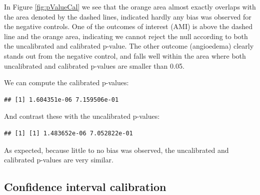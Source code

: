 \documentclass[11pt]{book}
\newenvironment{Shaded}{\begin{snugshade}}{\end{snugshade}}
\newcommand{\DataTypeTok}[1]{\textcolor[rgb]{0.13,0.29,0.53}{#1}}
\newcommand{\KeywordTok}[1]{\textcolor[rgb]{0.13,0.29,0.53}{\textbf{#1}}}
\newcommand{\NormalTok}[1]{#1}
\newcommand{\OperatorTok}[1]{\textcolor[rgb]{0.81,0.36,0.00}{\textbf{#1}}}
\newcommand{\StringTok}[1]{\textcolor[rgb]{0.31,0.60,0.02}{#1}}
\theoremstyle{definition}
\theoremstyle{definition}
\theoremstyle{definition}
\theoremstyle{remark}
\begin{document}
In Figure \ref{fig:pValueCal} we see that the orange area almost exactly overlaps with the area denoted by the dashed lines, indicated hardly any bias was observed for the negative controls. One of the outcomes of interest (AMI) is above the dashed line and the orange area, indicating we cannot reject the null according to both the uncalibrated and calibrated p-value. The other outcome (angioedema) clearly stands out from the negative control, and falls well within the area where both uncalibrated and calibrated p-values are smaller than 0.05.

We can compute the calibrated p-values:

\begin{Shaded}
\end{Shaded}

\begin{verbatim}
## [1] 1.604351e-06 7.159506e-01
\end{verbatim}

And contrast these with the uncalibrated p-values:

\begin{Shaded}
\end{Shaded}

\begin{verbatim}
## [1] [1] 1.483652e-06 7.052822e-01
\end{verbatim}

As expected, because little to no bias was observed, the uncalibrated and calibrated p-values are very similar.

\hypertarget{confidence-interval-calibration-1}{%
\subsection{Confidence interval calibration}\label{confidence-interval-calibration-1}}
\end{document}
